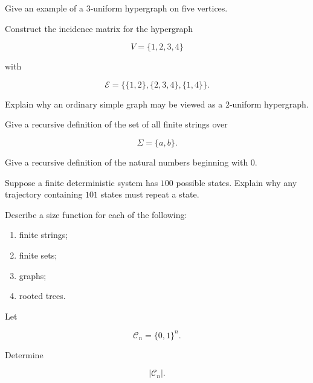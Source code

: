 \begin{exercise}[2]
Give an example of a \(3\)-uniform hypergraph on five vertices.
\end{exercise}

\begin{exercise}[2]
Construct the incidence matrix for the hypergraph

\[
V=\{1,2,3,4\}
\]

with

\[
\mathcal{E}
=
\{
\{1,2\},
\{2,3,4\},
\{1,4\}
\}.
\]
\end{exercise}

\begin{exercise}[2]
Explain why an ordinary simple graph may be viewed as a \(2\)-uniform
hypergraph.
\end{exercise}

\begin{exercise}[2]
Give a recursive definition of the set of all finite strings over

\[
\Sigma=\{a,b\}.
\]
\end{exercise}

\begin{exercise}[2]
Give a recursive definition of the natural numbers beginning with
\(0\).
\end{exercise}

\begin{exercise}[2]
Suppose a finite deterministic system has \(100\) possible states.
Explain why any trajectory containing \(101\) states must repeat a
state.
\end{exercise}

\begin{exercise}[2]
Describe a size function for each of the following:

\begin{enumerate}
    \item finite strings;
    \item finite sets;
    \item graphs;
    \item rooted trees.
\end{enumerate}
\end{exercise}

\begin{exercise}[2]
Let

\[
\mathcal{C}_n=\{0,1\}^n.
\]

Determine

\[
|\mathcal{C}_n|.
\]
\end{exercise}

